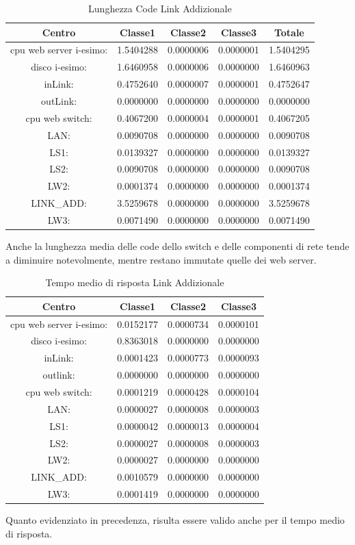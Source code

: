 \begin{table}[htbp]
\begin{center}
\begin{tabular}{||c|c|c|c|c||}
\hline
Centro &Classe1 &Classe2 &Classe3 &Totale\\
\hline
\hline
 cpu web server i-esimo: 	&1.5404288	&0.0000006	&0.0000001	&1.5404295\\
\hline
 disco i-esimo: 	&1.6460958	&0.0000006	&0.0000000	&1.6460963\\
\hline
 inLink: 	&0.4752640	&0.0000007	&0.0000001	&0.4752647\\
\hline
 outLink: 	&0.0000000	&0.0000000	&0.0000000	&0.0000000\\
\hline
 cpu web switch: 	&0.4067200	&0.0000004	&0.0000001	&0.4067205\\
\hline
 LAN: 	&0.0090708	&0.0000000	&0.0000000	&0.0090708\\
\hline
 LS1: 	&0.0139327	&0.0000000	&0.0000000	&0.0139327\\
\hline
 LS2: 	&0.0090708	&0.0000000	&0.0000000	&0.0090708\\
\hline
 LW2: 	&0.0001374	&0.0000000	&0.0000000	&0.0001374\\
\hline
 LINK\_ADD: 	&3.5259678	&0.0000000	&0.0000000	&3.5259678\\
\hline
 LW3: 	&0.0071490	&0.0000000	&0.0000000	&0.0071490\\
\hline
\end{tabular}
\end{center}
\caption{Lunghezza Code Link Addizionale}
\label{lunghezzacode}
\end{table}
Anche la lunghezza media delle code dello switch e delle componenti di rete tende a diminuire notevolmente, mentre restano immutate quelle dei web server.
\begin{table}[htbp]
\begin{center}
\begin{tabular}{||c|c|c|c||}
\hline
Centro &Classe1 &Classe2 &Classe3\\
\hline
\hline
 cpu web server i-esimo: 	&0.0152177	&0.0000734	&0.0000101\\
\hline
 disco i-esimo: 	&0.8363018	&0.0000000	&0.0000000\\
\hline
 inLink: 	&0.0001423	&0.0000773	&0.0000093\\
\hline
 outlink: 	&0.0000000	&0.0000000	&0.0000000\\
\hline
 cpu web switch: 	&0.0001219	&0.0000428	&0.0000104\\
\hline
 LAN: 	&0.0000027	&0.0000008	&0.0000003\\
\hline
 LS1: 	&0.0000042	&0.0000013	&0.0000004\\
\hline
 LS2: 	&0.0000027	&0.0000008	&0.0000003\\
\hline
 LW2: 	&0.0000027	&0.0000000	&0.0000000\\
\hline
 LINK\_ADD: 	&0.0010579	&0.0000000	&0.0000000\\
\hline
 LW3: 	&0.0001419	&0.0000000	&0.0000000\\
\hline
\end{tabular}
\end{center}
\caption{Tempo medio di risposta Link Addizionale}
\label{tempomediodirisposta}
\end{table}
Quanto evidenziato in precedenza, risulta essere valido anche per il tempo medio di risposta.
